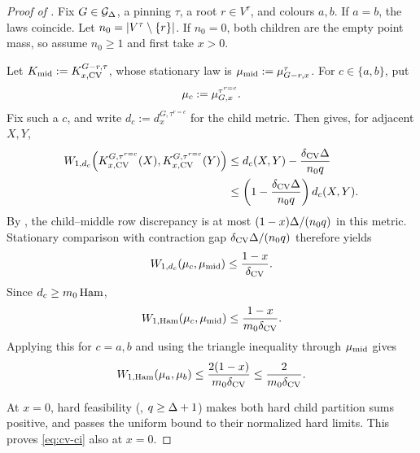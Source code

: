 \begin{proof}[Proof of ]
Fix \(G\in\Gdeg\), a pinning \(\tau\), a root \(r\in V^\tau\), and
colours \(a,b\). If
\(a=b\), the laws coincide.  Let \(n_0=\abs{V^\tau\setminus\{r\}}\).  If
\(n_0=0\), both children are the empty point mass, so assume \(n_0\ge1\)
and first take \(x>0\).

Let \(K_{\rm mid}:=K_{x,\mathrm{CV}}^{G-r,\tau}\), whose stationary law is
\(\mu_{\rm mid}:=\mupin{G-r}{\tau}{x}\). For \(c\in\{a,b\}\), put
\[
  \mu_c:=\mupin{G}{\tau^{r=c}}{x}.
\]
Fix such a \(c\), and write \(d_c:=d_x^{G,\tau^{r=c}}\) for the child metric.
Then
 gives, for adjacent \(X,Y\),
\[
\begin{aligned}
  W_{1,d_c}\!\left(
      K_{x,\mathrm{CV}}^{G,\tau^{r=c}}(X),
      K_{x,\mathrm{CV}}^{G,\tau^{r=c}}(Y)\right)
  &\le d_c(X,Y)-\frac{\delta_{\rm CV}\Deg}{n_0q}\\
  &\le\left(1-\frac{\delta_{\rm CV}\Deg}{n_0q}\right)
       d_c(X,Y).
\end{aligned}
\]
By , the child--middle row discrepancy is at most
\((1-x)\Deg/(n_0q)\) in this metric.  Stationary comparison with
contraction gap \(\delta_{\rm CV}\Deg/(n_0q)\) therefore yields
\[
  W_{1,d_c}(\mu_c,\mu_{\rm mid})
  \le\frac{1-x}{\delta_{\rm CV}}.
\]
Since \(d_c\ge m_0\Ham\),
\[
  \WHam(\mu_c,\mu_{\rm mid})
  \le\frac{1-x}{m_0\delta_{\rm CV}}.
\]
Applying this for \(c=a,b\) and using the triangle inequality through
\(\mu_{\rm mid}\) gives
\[
  \WHam(\mu_a,\mu_b)
  \le\frac{2(1-x)}{m_0\delta_{\rm CV}}
  \le\frac{2}{m_0\delta_{\rm CV}}.
\]

At \(x=0\), hard feasibility (, \(q\ge\Deg+1\))
makes both hard child partition sums positive, and
 passes the uniform bound to their
normalized hard limits. This proves \eqref{eq:cv-ci} also at \(x=0\).
\end{proof}
